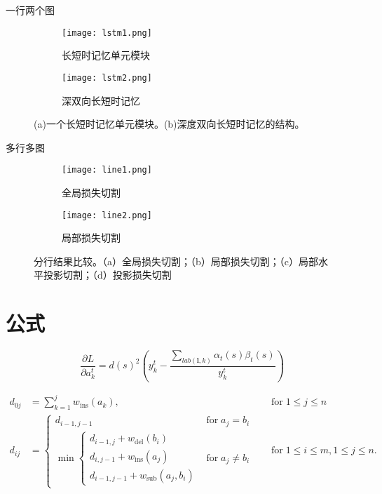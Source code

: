 \documentclass[winfonts]{njuthesis}
\begin{document}
一行两个图
\begin{figure}[ht!]
    \centering
    \begin{subfigure}{.5\textwidth}
    	\centering
        \texttt{[image: lstm1.png]}
        \caption{长短时记忆单元模块}
    \end{subfigure}
    \begin{subfigure}{.4\textwidth}
    	\centering
        \texttt{[image: lstm2.png]}
        \caption{深双向长短时记忆}
        \label{fig:lstm2}
    \end{subfigure}
    \caption{(a)一个长短时记忆单元模块。(b)深度双向长短时记忆的结构。}
\label{fig:lstm}
\end{figure}

多行多图
\begin{figure}[ht!]
    \centering
    \begin{subfigure}{\textwidth}
        \centering
        \texttt{[image: line1.png]}
        \caption{全局损失切割}
        \label{fig:line1}
    \end{subfigure}
    \begin{subfigure}{\textwidth}
    	\centering
        \texttt{[image: line2.png]}
        \caption{局部损失切割}
        \label{fig:line2}
    \end{subfigure}
    \caption{分行结果比较。（a）全局损失切割；（b）局部损失切割；（c）局部水平投影切割；（d）投影损失切割}
\end{figure}

\newpage %


\section{公式}

\begin{equation}
\frac{\partial L}{\partial a_{k}^t} = {d(s)}^2 (y_{k}^t - \frac{\sum_{lab(\mathbf{l},k)} \alpha_t(s)\beta_t(s) }{y_{k}^t} )
\end{equation}

\begin{equation}
\begin{aligned}
d_{{0j}}&=\sum _{{k=1}}^{{j}}w_{{\mathrm  {ins}}}(a_{{k}}),\quad &{\text{for}}\;1\leq j\leq n\\
d_{{ij}}&={\begin{cases}d_{{i-1,j-1}}&{\text{for}}\;a_{{j}}=b_{{i}}\\\min {\begin{cases}d_{{i-1,j}}+w_{{\mathrm  {del}}}(b_{{i}})\\d_{{i,j-1}}+w_{{\mathrm  {ins}}}(a_{{j}})\\d_{{i-1,j-1}}+w_{{\mathrm  {sub}}}(a_{{j}},b_{{i}})\end{cases}}&{\text{for}}\;a_{{j}}\neq b_{{i}}\end{cases}}\quad &{\text{for}}\;1\leq i\leq m,1\leq j\leq n.
\end{aligned}
\end{equation}
\end{document}
